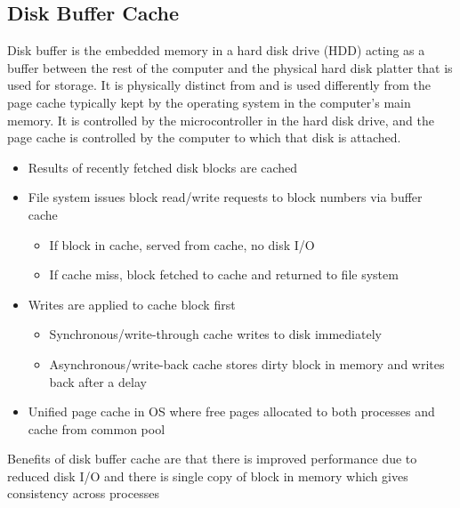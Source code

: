 \documentclass{article}
\begin{document}
\subsection{Disk Buffer Cache}
 Disk buffer is the embedded memory in a hard disk drive (HDD) acting as a buffer between the rest of the computer and the physical hard disk platter that is used for storage. It is physically distinct from and is used differently from the page cache typically kept by the operating system in the computer's main memory.
 It is controlled by the microcontroller in the hard disk drive, and the page cache is controlled by the computer to which that disk is attached.
 \begin{itemize}
     \item Results of recently fetched disk blocks are cached
     \item File system issues block read/write requests to block numbers via buffer cache
     \begin{itemize}
         \item If block in cache, served from cache, no disk I/O
         \item If cache miss, block fetched to cache and returned to file system
     \end{itemize}
     \item Writes are applied to cache block first
     \begin{itemize}
         \item Synchronous/write-through cache writes to disk immediately
         \item Asynchronous/write-back cache stores dirty block in memory and writes back after a delay
     \end{itemize}
     \item Unified page cache in OS where free pages allocated to both processes and cache from common pool
 \end{itemize}
 Benefits of disk buffer cache are that there is improved performance due to reduced disk I/O and there is single copy of block in memory which gives consistency across processes
 
\end{document}
